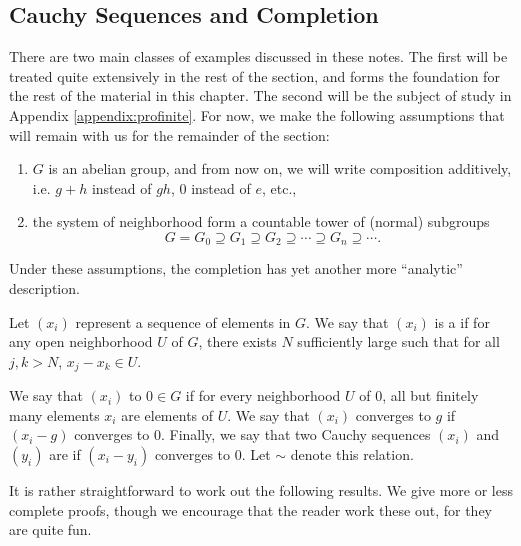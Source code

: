 \subsection{Cauchy Sequences and Completion}

There are two main classes of examples discussed in these notes.
The first will be treated quite extensively in the rest of the
section, and forms the foundation for the rest of the material in 
this chapter. The second will be the subject of study in Appendix 
\ref{appendix:profinite}. For now, we make the following 
assumptions that will remain with us for the remainder of the 
section:

\begin{enumerate}
\item $G$ is an abelian group, and from now on, we will write
composition additively, i.e. $g + h$ instead of $gh$, $0$ instead
of $e$, etc.,

\item the system of neighborhood form a countable tower of (normal)
subgroups
\[
G = G_0 \supseteq G_1 \supseteq G_2 \supseteq \cdots \supseteq G_n 
\supseteq \cdots.
\]

\end{enumerate}

Under these assumptions, the completion has yet another more 
``analytic'' description.

\begin{defn}
Let $(x_i)$ represent a sequence of elements in $G$. We say that
$(x_i)$ is a  if for
any open neighborhood $U$ of $G$, there exists $N$ sufficiently
large such that for all $j, k > N$, $x_j - x_k \in U$.

We say that $(x_i)$  
to $0 \in G$ if for every neighborhood $U$ of $0$, all but 
finitely many elements $x_i$ are elements of $U$. We say that
$(x_i)$ converges to $g$ if $(x_i - g)$ converges to $0$.
Finally, we say that two Cauchy sequences $(x_i)$ and $(y_i)$ are 
 if $(x_i - y_i)$
converges to $0$. Let $\sim$ denote this relation.
\end{defn}

It is rather straightforward to work out the following results.
We give more or less complete proofs, though we encourage that the 
reader work these out, for they are quite fun.


